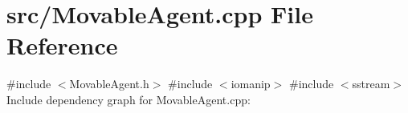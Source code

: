 \section{src/\+Movable\+Agent.cpp File Reference}
\label{_movable_agent_8cpp}
{\ttfamily \#include $<$Movable\+Agent.\+h$>$}\newline
{\ttfamily \#include $<$iomanip$>$}\newline
{\ttfamily \#include $<$sstream$>$}\newline
Include dependency graph for Movable\+Agent.\+cpp\+:
